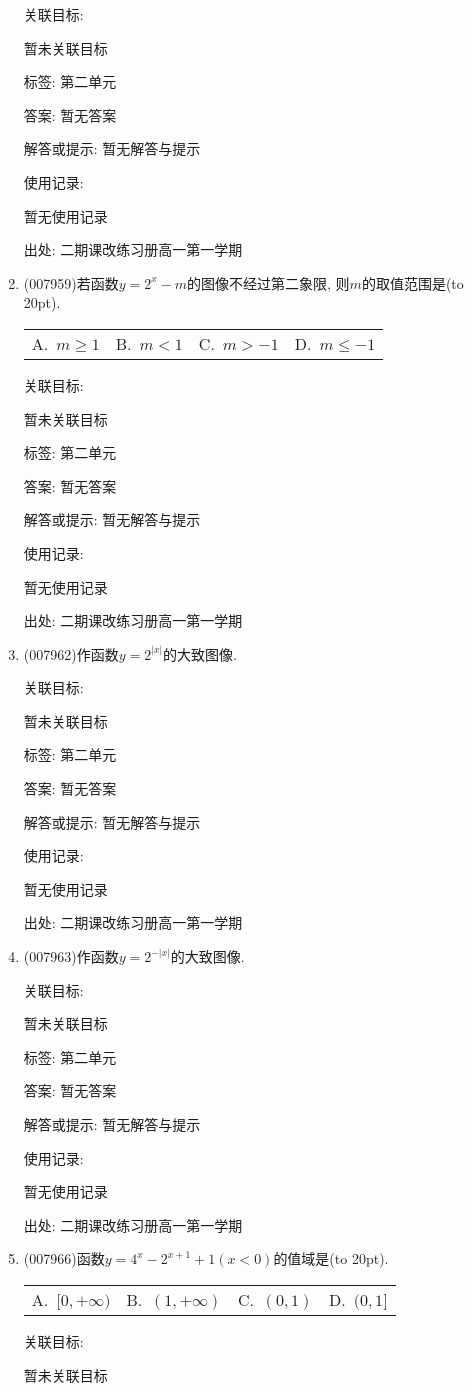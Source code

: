 \documentclass[10pt,a4paper]{article}
\newcommand{\bracket}[1]{(\hbox to #1pt{})}
\newcommand{\fourch}[4]{\par\begin{tabular}{p{.23\textwidth}p{.23\textwidth}p{.23\textwidth}p{.23\textwidth}}
A.~#1 &B.~#2& C.~#3& D.~#4
\end{tabular}}
\begin{document}
\begin{enumerate}[1.]
关联目标:

暂未关联目标



标签: 第二单元

答案: 暂无答案

解答或提示: 暂无解答与提示

使用记录:

暂无使用记录


出处: 二期课改练习册高一第一学期
\item { (007959)}若函数$y=2^x-m$的图像不经过第二象限, 则$m$的取值范围是\bracket{20}.
\fourch{$m\ge 1$}{$m<1$}{$m>-1$}{$m\le -1$}


关联目标:

暂未关联目标



标签: 第二单元

答案: 暂无答案

解答或提示: 暂无解答与提示

使用记录:

暂无使用记录


出处: 二期课改练习册高一第一学期
\item { (007962)}作函数$y=2^{|x|}$的大致图像.


关联目标:

暂未关联目标



标签: 第二单元

答案: 暂无答案

解答或提示: 暂无解答与提示

使用记录:

暂无使用记录


出处: 二期课改练习册高一第一学期
\item { (007963)}作函数$y=2^{-|x|}$的大致图像.


关联目标:

暂未关联目标



标签: 第二单元

答案: 暂无答案

解答或提示: 暂无解答与提示

使用记录:

暂无使用记录


出处: 二期课改练习册高一第一学期
\item { (007966)}函数$y=4^x-2^{x+1}+1(x<0)$的值域是\bracket{20}.
\fourch{$[0,+\infty)$}{$(1,+\infty)$}{$(0,1)$}{$(0,1]$}


关联目标:

暂未关联目标




\end{enumerate}
\end{document}
